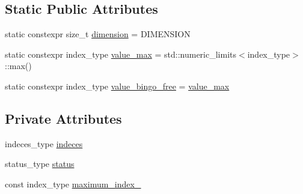 \subsection*{Static Public Attributes}
\begin{DoxyCompactItemize}
\item 
static constexpr size\-\_\-t \hyperlink{structWonderRabbitProject_1_1bingo_1_1card_a7be3063bac0a8fc2df63acbb2fa2439f}{dimension} = D\-I\-M\-E\-N\-S\-I\-O\-N
\item 
static constexpr index\-\_\-type \hyperlink{structWonderRabbitProject_1_1bingo_1_1card_a5409fd54b41693dd89b811ffaef710b2}{value\-\_\-max} = std\-::numeric\-\_\-limits$<$index\-\_\-type$>$\-::max()
\item 
static constexpr index\-\_\-type \hyperlink{structWonderRabbitProject_1_1bingo_1_1card_aea4ef488a201046ec273ef9673d8ff7f}{value\-\_\-bingo\-\_\-free} = \hyperlink{structWonderRabbitProject_1_1bingo_1_1card_a5409fd54b41693dd89b811ffaef710b2}{value\-\_\-max}
\end{DoxyCompactItemize}
\subsection*{Private Attributes}
\begin{DoxyCompactItemize}
\item 
indeces\-\_\-type \hyperlink{structWonderRabbitProject_1_1bingo_1_1card_a9f084cb6bb4bb022bc79f9b95050c9e8}{indeces}
\item 
status\-\_\-type \hyperlink{structWonderRabbitProject_1_1bingo_1_1card_a27c1c5693dfef24d350bc530e61422ae}{status}
\item 
const index\-\_\-type \hyperlink{structWonderRabbitProject_1_1bingo_1_1card_a495660e4f6214f2cc4a426ec6fe140e2}{maximum\-\_\-index\-\_\-}
\end{DoxyCompactItemize}



